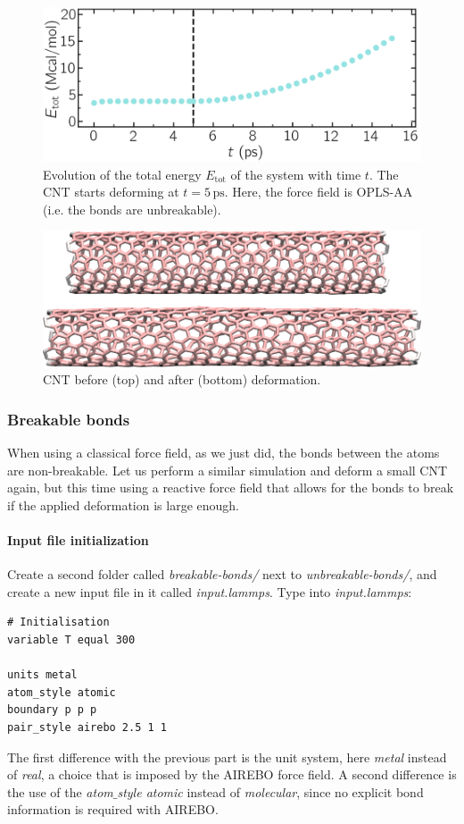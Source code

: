 \documentclass[9pt,tutorial]{livecoms}
\begin{document}
\begin{figure}
\centering
\includegraphics[width=\linewidth]{CNT-energy-unbreakable}
\caption{Evolution of the total energy $E_\text{tot}$ of the system with time $t$. The CNT starts deforming at $t = 5\,\text{ps}$. Here, the force field is OPLS-AA (i.e. the bonds are unbreakable).}
\label{fig:CNT-unbreakable-energy}
\end{figure}

\begin{figure}
\centering
\includegraphics[width=\linewidth]{CNT-deformed-unbreakable}
\caption{CNT before (top) and after (bottom) deformation.}
\label{fig:CNT-deformed-unbreakable}
\end{figure}

\subsubsection{Breakable bonds}
When using a classical force field, as we just did, the bonds between the atoms are non-breakable. Let us perform a similar simulation and deform a small CNT again, but this time using a reactive force field that allows for the bonds to break if the applied deformation is large enough.

\paragraph{Input file initialization}
\noindent Create a second folder called \textit{breakable-bonds/} next to \textit{unbreakable-bonds/}, and create a new input file in it called \textit{input.lammps}. Type into \textit{input.lammps}:
{\normalsize \begin{verbatim}
# Initialisation
variable T equal 300

units metal
atom_style atomic
boundary p p p
pair_style airebo 2.5 1 1
\end{verbatim}}
The first difference with the previous part is the unit system, here \textit{metal} instead of \textit{real}, a choice that is imposed by the AIREBO force field. A second difference is the use of the \textit{atom$\_$style atomic} instead of \textit{molecular}, since no explicit bond information is required with AIREBO.
\end{document}

